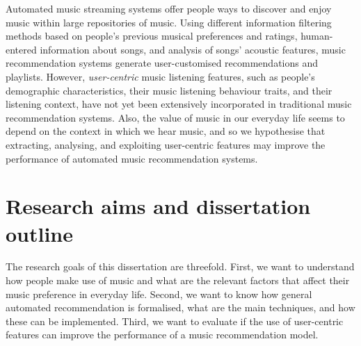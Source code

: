 Automated music streaming systems offer people ways to discover and enjoy music within large repositories of music. Using different information filtering methods based on people's previous musical preferences and ratings, human-entered information about songs, and analysis of songs' acoustic features, music recommendation systems generate user-customised recommendations and playlists.
However, \textit{user-centric} music listening features, such as people's demographic characteristics, their music listening behaviour traits, and their listening context, have not yet been extensively incorporated in traditional music recommendation systems. 
Also, the value of music in our everyday life seems to depend on the context in which we hear music, and so we hypothesise that extracting, analysing, and exploiting user-centric features may improve the performance of automated music recommendation systems.














\section{Research aims and dissertation outline}
The research goals of this dissertation are threefold.
First, we want to understand how people make use of music and what are the relevant factors that affect their music preference in everyday life. 
Second, we want to know how general automated recommendation is formalised, what are the main techniques, and how these can be implemented.
Third, we want to evaluate if the use of user-centric features can improve the performance of a music recommendation model.


